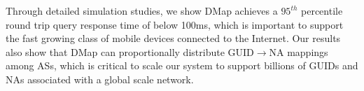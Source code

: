 Through detailed simulation studies, we show DMap achieves a $95^{th}$ percentile round trip query response time of below 100ms, which is important to support the fast growing class of mobile devices connected to the Internet.
%
%
Our results also show that DMap can proportionally distribute GUID$\rightarrow$NA mappings among ASs, which is critical to scale our system to support billions of GUIDs and NAs associated with a global scale network. 
%
%







